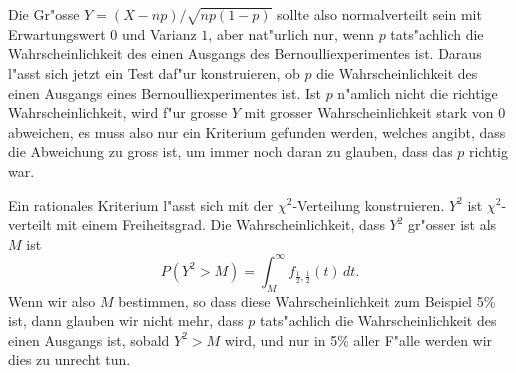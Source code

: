 Die Gr"osse $Y=(X-np)/\sqrt{np(1-p)}$ sollte also normalverteilt sein
mit Erwartungswert $0$ und Varianz $1$, aber nat"urlich nur, wenn $p$
tats"achlich die Wahrscheinlichkeit des einen Ausgangs des
Bernoulliexperimentes ist. Daraus l"asst sich jetzt ein Test daf"ur
konstruieren, ob $p$ die Wahrscheinlichkeit des einen Ausgangs eines
Bernoulliexperimentes ist. Ist $p$ n"amlich nicht die richtige
Wahrscheinlichkeit, wird f"ur grosse $Y$ mit grosser Wahrscheinlichkeit
stark von $0$ abweichen, es muss also nur ein Kriterium gefunden werden,
welches angibt, dass die Abweichung zu gross ist, um immer noch daran
zu glauben, dass das $p$ richtig war.

Ein rationales Kriterium l"asst sich mit der $\chi^2$-Verteilung konstruieren.
$Y^2$ ist $\chi^2$-verteilt mit einem Freiheitsgrad.
Die Wahrscheinlichkeit, dass $Y^2$ gr"osser ist als $M$ ist
\[
P(Y^2>M)=\int_M^\infty f_{\frac12,\frac12}(t)\,dt.
\]
Wenn wir also $M$ bestimmen, so dass diese Wahrscheinlichkeit 
zum Beispiel 5\% ist, dann glauben wir nicht mehr, dass $p$ tats"achlich
die Wahrscheinlichkeit des einen Ausgangs ist, sobald $Y^2>M$ wird,
und nur in 5\% aller F"alle werden wir dies zu unrecht tun.

